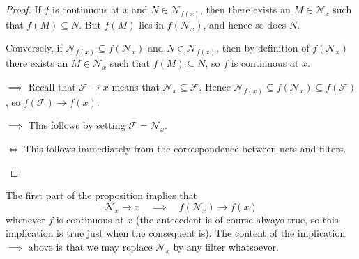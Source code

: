 \documentclass[article, a4paper, 11pt, oneside]{memoir}
\numberwithin{equation}{chapter}
\newcommand{\calF}{\mathcal{F}}
\newcommand{\calN}{\mathcal{N}}
\newcommand{\nhoods}[1]{\calN_{#1}}
\begin{document}
\begin{proof}
    If $f$ is continuous at $x$ and $N \in \nhoods{f(x)}$, then there exists an $M \in \nhoods{x}$ such that $f(M) \subseteq N$. But $f(M)$ lies in $f(\nhoods{x})$, and hence so does $N$.

    Conversely, if $\nhoods{f(x)} \subseteq f(\nhoods{x})$ and $N \in \nhoods{f(x)}$, then by definition of $f(\nhoods{x})$ there exists an $M \in \nhoods{x}$ such that $f(M) \subseteq N$, so $f$ is continuous at $x$.
%
\begin{proofsec}
    \item[\subcref{enum:continuity-point} $\implies$ \subcref{enum:filter-convergence-point}]
    Recall that $\calF \to x$ means that $\nhoods{x} \subseteq \calF$. Hence $\nhoods{f(x)} \subseteq f(\nhoods{x}) \subseteq f(\calF)$, so $f(\calF) \to f(x)$.

    \item[\subcref{enum:filter-convergence-point} $\implies$ \subcref{enum:continuity-point}]
    This follows by setting $\calF = \nhoods{x}$.

    \item[\subcref{enum:filter-convergence-point} $\Leftrightarrow$ \subcref{enum:net-convergence-point}]
    This follows immediately from the correspondence between nets and filters.
\end{proofsec}
\end{proof}
%
The first part of the proposition implies that
%
\begin{equation*}
    \nhoods{x} \to x
    \quad \implies \quad
    f(\nhoods{x}) \to f(x)
\end{equation*}
%
whenever $f$ is continuous at $x$ (the antecedent is of course always true, so this implication is true just when the consequent is). The content of the implication  $\implies$  above is that we may replace $\nhoods{x}$ by any filter whatsoever.


\nocite{*}

\printbibliography
\end{document}
